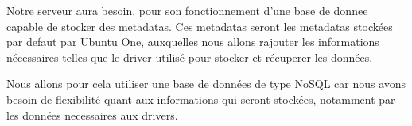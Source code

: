 Notre serveur aura besoin, pour son fonctionnement d'une base de donnee capable de stocker des metadatas.
Ces metadatas seront les metadatas stockées par defaut par Ubuntu One, auxquelles nous allons rajouter les informations nécessaires telles que le driver utilisé pour stocker et récuperer les données.

Nous allons pour cela utiliser une base de données de type NoSQL car nous avons besoin de flexibilité quant aux informations qui seront stockées, notamment par les données necessaires aux drivers.
